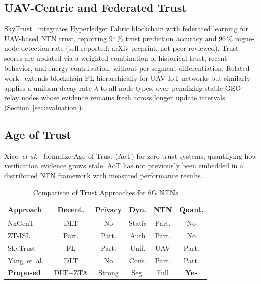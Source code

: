 \documentclass[journal,twoside,10pt]{IEEEtran}
\begin{document}
\subsection{UAV-Centric and Federated Trust}

SkyTrust~\cite{uav_fl} integrates Hyperledger Fabric blockchain with
federated learning for UAV-based NTN trust, reporting 94\,\% trust
prediction accuracy and 96\,\% rogue-node detection rate
(self-reported; arXiv preprint, not peer-reviewed).
Trust scores are updated via a weighted combination of historical trust,
recent behavior, and energy contribution, without per-segment
differentiation.
Related work~\cite{tong2024} extends blockchain FL hierarchically for
UAV IoT networks but similarly applies a uniform decay rate $\lambda$
to all node types, over-penalizing stable GEO relay nodes whose
evidence remains fresh across longer update intervals
(Section~\ref{sec:evaluation}).

\subsection{Age of Trust}

Xiao~\textit{et al.}~\cite{aot} formalize Age of Trust (AoT) for
zero-trust systems, quantifying how verification evidence grows stale.
AoT has not previously been embedded in a distributed NTN framework
with measured performance results.

\begin{table}[t]
\centering
\caption{Comparison of Trust Approaches for 6G NTNs}
\label{tab:related}
\renewcommand{\arraystretch}{1.15}
\small
\begin{tabular}{lccccc}
\toprule
\textbf{Approach} & \textbf{Decent.} & \textbf{Privacy} &
\textbf{Dyn.} & \textbf{NTN} & \textbf{Quant.} \\
\midrule
NxGenT~\cite{nxgent}         & DLT   & No    & Static & Part. & No \\
ZT-ISL~\cite{ztisl}          & Part. & Part. & Auth   & Part. & No \\
SkyTrust~\cite{uav_fl,tong2024} & FL  & Part. & Unif.  & UAV   & Part. \\
Yang~et~al.~\cite{yang2024}  & DLT   & No    & Cons.  & Part. & Part.\\
\textbf{Proposed}            & DLT+ZTA & Strong & Seg. & Full & \textbf{Yes}\\
\bottomrule
\end{tabular}
\end{table}
\end{document}
